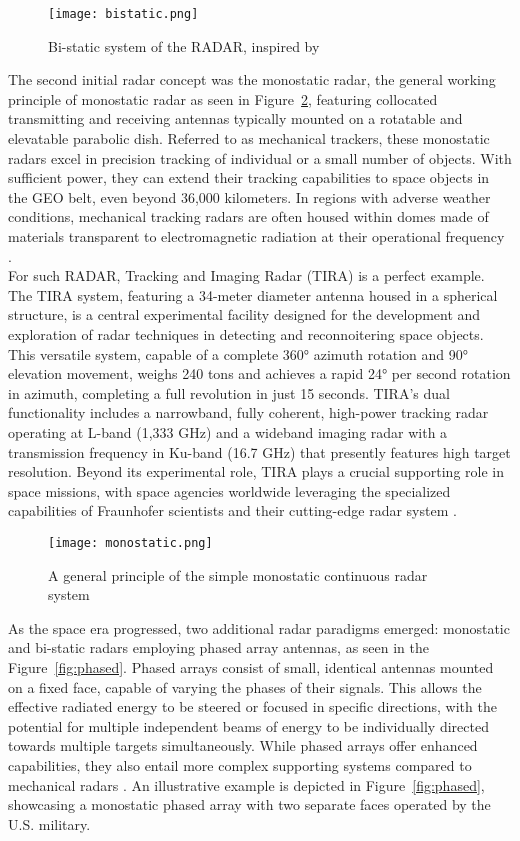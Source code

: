 \begin{figure}[H]
	\centering
	\texttt{[image: bistatic.png]}
	\caption{ Bi-static system of the RADAR, inspired by \cite{bistat}}\label{fig:bistatic}
\end{figure}

The second initial radar concept was the monostatic radar, the general working principle of monostatic radar as seen in Figure~\ref{fig:monostat}, featuring collocated transmitting and receiving antennas typically mounted on a rotatable and elevatable parabolic dish. Referred to as mechanical trackers, these monostatic radars excel in precision tracking of individual or a small number of objects. With sufficient power, they can extend their tracking capabilities to space objects in the GEO belt, even beyond 36,000 kilometers. In regions with adverse weather conditions, mechanical tracking radars are often housed within domes made of materials transparent to electromagnetic radiation at their operational frequency \cite{weeden}.\\
For such RADAR, Tracking and Imaging Radar (TIRA) is 
a perfect example. The TIRA system, featuring a 34-meter diameter antenna housed in a spherical structure, is a central experimental facility designed for the development and exploration of radar techniques in detecting and reconnoitering space objects. This versatile system, capable of a complete 360° azimuth rotation and 90° elevation movement, weighs 240 tons and achieves a rapid 24° per second rotation in azimuth, completing a full revolution in just 15 seconds. TIRA's dual functionality includes a narrowband, fully coherent, high-power tracking radar operating at L-band (1,333 GHz) and a wideband imaging radar with a transmission frequency in Ku-band (16.7 GHz) that presently features high target resolution. 
Beyond its experimental role, TIRA plays a crucial supporting role in space missions, with space agencies worldwide leveraging the specialized capabilities of Fraunhofer scientists and their cutting-edge radar system \cite{tir}.\\

\begin{figure}[H]
	\centering
	\texttt{[image: monostatic.png]}
	\caption{ A general principle of the simple monostatic continuous radar system \cite{jena2019}}\label{fig:monostat}
\end{figure}


As the space era progressed, two additional radar paradigms emerged: monostatic and bi-static radars employing phased array antennas, as seen in the Figure~\ref{fig:phased}. Phased arrays consist of small, identical antennas mounted on a fixed face, capable of varying the phases of their signals. This allows the effective radiated energy to be steered or focused in specific directions, with the potential for multiple independent beams of energy to be individually directed towards multiple targets simultaneously. While phased arrays offer enhanced capabilities, they also entail more complex supporting systems compared to mechanical radars \cite{Reed}. An illustrative example is depicted in Figure~\ref{fig:phased}, showcasing a monostatic phased array with two separate faces operated by the U.S. military.

